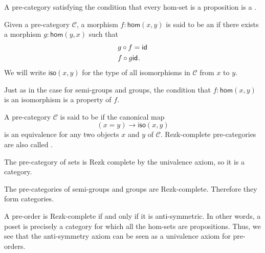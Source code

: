 \begin{eg}
  A pre-category satisfying the condition that every hom-set is a proposition is a . 
\end{eg}

\begin{defn}
  Given a pre-category $\mathcal{C}$, a morphism $f:\mathsf{hom}(x,y)$ is said to be an  if there exists a morphism $g:\mathsf{hom}(y,x)$ such that
  \begin{align*}
    g\circ f & = \mathsf{id}_{} \\
    f \circ g & \mathsf{id}_{}.
  \end{align*}
  We will write $\mathsf{iso}(x,y)$ for the type of all isomorphisms in $\mathcal{C}$ from $x$ to $y$.
\end{defn}

\begin{rmk}
  Just as in the case for semi-groups and groups, the condition that $f:\mathsf{hom}(x,y)$ is an isomorphism is a property of $f$.
\end{rmk}

\begin{defn}
  A pre-category $\mathcal{C}$ is said to be  if the canonical map
  \begin{equation*}
    (x=y)\to \mathsf{iso}(x,y)
  \end{equation*}
  is an equivalence for any two objects $x$ and $y$ of $\mathcal{C}$. Rezk-complete pre-categories are also called .
\end{defn}

\begin{eg}
  The pre-category of sets is Rezk complete by the univalence axiom, so it is a category.
\end{eg}

\begin{eg}
  The pre-categories of semi-groups and groups are Rezk-complete. Therefore they form categories.
\end{eg}

\begin{eg}
  A pre-order is Rezk-complete if and only if it is anti-symmetric. In other words, a poset is precisely a category for which all the hom-sets are propositions. Thus, we see that the anti-symmetry axiom can be seen as a univalence axiom for pre-orders.
\end{eg}


